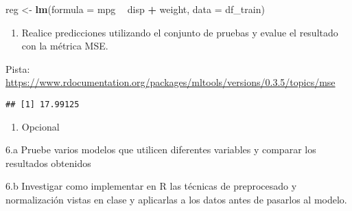 \documentclass[]{article}
\newenvironment{Shaded}{\begin{snugshade}}{\end{snugshade}}
\newcommand{\DataTypeTok}[1]{\textcolor[rgb]{0.13,0.29,0.53}{#1}}
\newcommand{\KeywordTok}[1]{\textcolor[rgb]{0.13,0.29,0.53}{\textbf{#1}}}
\newcommand{\NormalTok}[1]{#1}
\newcommand{\OperatorTok}[1]{\textcolor[rgb]{0.81,0.36,0.00}{\textbf{#1}}}
\newcommand{\StringTok}[1]{\textcolor[rgb]{0.31,0.60,0.02}{#1}}
\providecommand{\tightlist}{%
  \setlength{\itemsep}{0pt}\setlength{\parskip}{0pt}}
\begin{document}
\begin{Shaded}
\end{Shaded}

\begin{Shaded}
\begin{Highlighting}[]
\NormalTok{reg <-}\StringTok{ }\KeywordTok{lm}\NormalTok{(}\DataTypeTok{formula =}\NormalTok{ mpg }\OperatorTok{~}\StringTok{ }\NormalTok{disp }\OperatorTok{+}\StringTok{ }\NormalTok{weight, }\DataTypeTok{data =}\NormalTok{ df_train)}
\end{Highlighting}
\end{Shaded}

\begin{enumerate}
\def\labelenumi{\arabic{enumi}.}
\setcounter{enumi}{4}
\tightlist
\item
  Realice predicciones utilizando el conjunto de pruebas y evalue el
  resultado con la métrica MSE.
\end{enumerate}

Pista:
\url{https://www.rdocumentation.org/packages/mltools/versions/0.3.5/topics/mse}

\begin{Shaded}
\end{Shaded}

\begin{verbatim}
## [1] 17.99125
\end{verbatim}

\begin{enumerate}
\def\labelenumi{\arabic{enumi}.}
\setcounter{enumi}{5}
\tightlist
\item
  Opcional
\end{enumerate}

6.a Pruebe varios modelos que utilicen diferentes variables y comparar
los resultados obtenidos

6.b Investigar como implementar en R las técnicas de preprocesado y
normalización vistas en clase y aplicarlas a los datos antes de pasarlos
al modelo.
\end{document}

